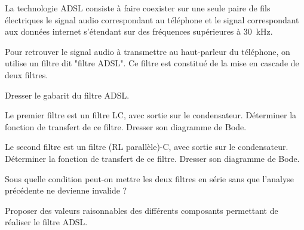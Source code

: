 

La technologie ADSL consiste à faire coexister sur une seule paire de fils électriques le signal audio correspondant au téléphone et le signal correspondant aux données internet s’étendant sur des fréquences supérieures à \SI{30}{kHz}.

Pour retrouver le signal audio à transmettre au haut-parleur du téléphone, on utilise un filtre dit "filtre ADSL". Ce filtre est constitué de la mise en cascade de deux filtres.

\question Dresser le gabarit du filtre ADSL.

\question Le premier filtre est un filtre LC, avec sortie sur le condensateur.
\subquestion Déterminer la fonction de transfert de ce filtre.
\subquestion Dresser son diagramme de Bode.

\question Le second filtre est un filtre (RL parallèle)-C, avec sortie sur le condensateur.
\subquestion Déterminer la fonction de transfert de ce filtre.
\subquestion Dresser son diagramme de Bode.

\question Sous quelle condition peut-on mettre les deux filtres en série sans que l'analyse précédente ne devienne invalide ?

\question Proposer des valeurs raisonnables des différents composants permettant de réaliser le filtre ADSL.
